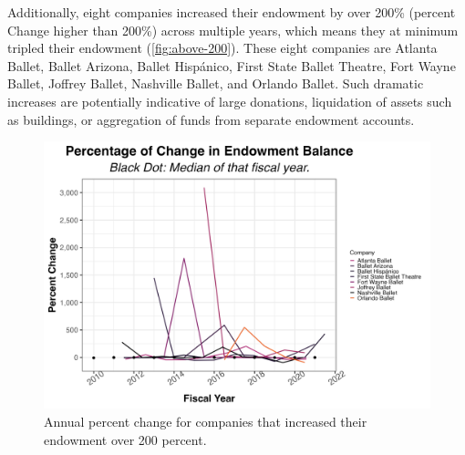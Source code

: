 \documentclass[Dance Data
Project,article,submit,moreauthors,pdftex]{mdpi}
\begin{document}
Additionally, eight companies increased their endowment by over 200\%
(percent Change higher than 200\%) across multiple years, which means
they at minimum tripled their endowment (\ref{fig:above-200}). These
eight companies are Atlanta Ballet, Ballet Arizona, Ballet Hispánico,
First State Ballet Theatre, Fort Wayne Ballet, Joffrey Ballet, Nashville
Ballet, and Orlando Ballet. Such dramatic increases are potentially
indicative of large donations, liquidation of assets such as buildings,
or aggregation of funds from separate endowment accounts.

\begin{figure}[H]
\includegraphics[width=0.9\linewidth,]{../images/pc_above_200} \caption{\label{fig:above-200} Annual percent change for companies that increased their endowment over 200 percent.}\label{fig:unnamed-chunk-9}
\end{figure}
\end{document}
